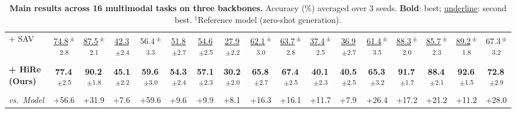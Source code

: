 \documentclass[sigconf,review,anonymous,9pt,table]{acmart}
\begin{document}
\begin{table}[t]
{\begin{tabular}{@{}l
  c c
  c c c c c
  c c c c
  c c c c c
  @{}}
+ SAV~\cite{mitra2025enhancing}
  & \underline{74.8}\textsuperscript{\,$\pm$2.8} & \underline{87.5}\textsuperscript{\,$\pm$2.1} & \underline{42.3}\textsuperscript{\,$\pm$2.4} & 56.4\textsuperscript{\,$\pm$3.3} & \underline{51.8}\textsuperscript{\,$\pm$2.7} & \underline{54.6}\textsuperscript{\,$\pm$2.5} & \underline{27.9}\textsuperscript{\,$\pm$2.2}
  & \underline{62.1}\textsuperscript{\,$\pm$3.0} & \underline{63.7}\textsuperscript{\,$\pm$2.8} & \underline{37.4}\textsuperscript{\,$\pm$2.5} & \underline{36.9}\textsuperscript{\,$\pm$2.7}
  & \underline{61.4}\textsuperscript{\,$\pm$3.5} & \underline{88.3}\textsuperscript{\,$\pm$2.0} & \underline{85.7}\textsuperscript{\,$\pm$2.3} & \underline{89.2}\textsuperscript{\,$\pm$1.8} & 67.3\textsuperscript{\,$\pm$3.2} \\
\cellcolor{myblue!8}\textbf{+ HiRe (Ours)}
  & \cellcolor{myblue!8}\textbf{77.4}\textsuperscript{\,$\pm$2.5} & \cellcolor{myblue!8}\textbf{90.2}\textsuperscript{\,$\pm$1.8} & \cellcolor{myblue!8}\textbf{45.1}\textsuperscript{\,$\pm$2.2} & \cellcolor{myblue!8}\textbf{59.6}\textsuperscript{\,$\pm$3.0} & \cellcolor{myblue!8}\textbf{54.3}\textsuperscript{\,$\pm$2.4} & \cellcolor{myblue!8}\textbf{57.1}\textsuperscript{\,$\pm$2.3} & \cellcolor{myblue!8}\textbf{30.2}\textsuperscript{\,$\pm$2.0}
  & \cellcolor{myblue!8}\textbf{65.8}\textsuperscript{\,$\pm$2.7} & \cellcolor{myblue!8}\textbf{67.4}\textsuperscript{\,$\pm$2.5} & \cellcolor{myblue!8}\textbf{40.1}\textsuperscript{\,$\pm$2.3} & \cellcolor{myblue!8}\textbf{40.5}\textsuperscript{\,$\pm$2.5}
  & \cellcolor{myblue!8}\textbf{65.3}\textsuperscript{\,$\pm$3.2} & \cellcolor{myblue!8}\textbf{91.7}\textsuperscript{\,$\pm$1.7} & \cellcolor{myblue!8}\textbf{88.4}\textsuperscript{\,$\pm$2.1} & \cellcolor{myblue!8}\textbf{92.6}\textsuperscript{\,$\pm$1.5} & \cellcolor{myblue!8}\textbf{72.8}\textsuperscript{\,$\pm$2.9} \\
\textcolor{mygreen}{\textit{vs.~Model}}
  & \multicolumn{1}{l}{\textcolor{mygreen}{+56.6}} & \multicolumn{1}{l}{\textcolor{mygreen}{+31.9}} & \multicolumn{1}{l}{\textcolor{mygreen}{+7.6}} & \multicolumn{1}{l}{\textcolor{mygreen}{+59.6}} & \multicolumn{1}{l}{\textcolor{mygreen}{+9.6}} & \multicolumn{1}{l}{\textcolor{mygreen}{+9.9}} & \multicolumn{1}{l}{\textcolor{mygreen}{+8.1}}
  & \multicolumn{1}{l}{\textcolor{mygreen}{+16.3}} & \multicolumn{1}{l}{\textcolor{mygreen}{+16.1}} & \multicolumn{1}{l}{\textcolor{mygreen}{+11.7}} & \multicolumn{1}{l}{\textcolor{mygreen}{+7.9}}
  & \multicolumn{1}{l}{\textcolor{mygreen}{+26.4}} & \multicolumn{1}{l}{\textcolor{mygreen}{+17.2}} & \multicolumn{1}{l}{\textcolor{mygreen}{+21.2}} & \multicolumn{1}{l}{\textcolor{mygreen}{+11.2}} & \multicolumn{1}{l}{\textcolor{mygreen}{+28.0}} \\
\bottomrule
\end{tabular}%
}
\caption{\textbf{Main results across 16 multimodal tasks on three backbones.}
  Accuracy (\%) averaged over 3 seeds. \textbf{Bold}: best; \underline{underline}: second best. 
  $^\dagger$Reference model (zero-shot generation).
}
\label{tbl:bigtable}
\end{table}
\end{document}
